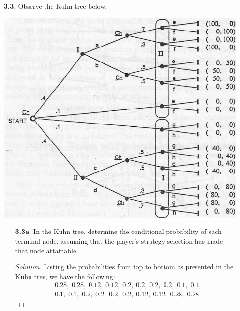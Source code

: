 \documentclass[ 12pt ]{article}
\begin{document}
\begin{enumerate}
\begin{enumerate}
			\item[\textbf{3.3.}] Observe the Kuhn tree below.
				\begin{center}
					\includegraphics{tree8}
				\end{center}
				\begin{enumerate}
					\item[\textbf{3.3a.}] In the Kuhn tree, determine the conditional probability of each terminal node, assuming that the player's strategy selection has made that node
						attainable.

						\begin{proof}[Solution]
							Listing the probabilities from top to bottom as presented in the Kuhn tree, we have the following:
							\begin{align*}
								&0.28,\; 0.28,\; 0.12,\; 0.12,\; 0.2,\; 0.2,\; 0.2,\; 0.2,\; 0.1,\; 0.1, \\
								&0.1,\; 0.1,\; 0.2,\; 0.2,\; 0.2,\; 0.2,\; 0.12,\; 0.12,\; 0.28,\; 0.28
							\end{align*}
						\end{proof}


\end{enumerate}
\end{enumerate}
\end{enumerate}
\end{document}
